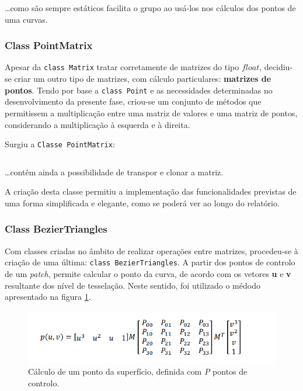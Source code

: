 \documentclass[relatorio.tex]{subfiles}
\begin{document}
\begin{code}
    \label{code:defmat}
\end{code}
\dots como são sempre estáticos facilita o grupo ao usá-los nos cálculos dos pontos de uma curvas.

\subsubsection{Class PointMatrix}
Apesar da \texttt{class Matrix} tratar corretamente de matrizes do tipo $float$,
decidiu-se criar um outro tipo de matrizes, com cálculo particulares:
\textbf{matrizes de pontos}. 
Tendo por base a \texttt{class Point} e as necessidades determinadas no desenvolvimento
da presente fase,
criou-se um conjunto de métodos que permitissem a multiplicação entre
uma matriz de valores e uma matriz de pontos, considerando a multiplicação à esquerda e à direita.

Surgiu a \texttt{Classe PointMatrix}:
\begin{code}
    \label{code:point_matrix.h}
    \inputminted[firstline=6, lastline=10]{cpp}{../../cartesian/PointMatrix.h}
\end{code}
\dots contêm ainda a possibilidade de transpor e clonar a matriz.

A criação desta classe permitiu a implementação das funcionalidades previstas de uma forma
simplificada e elegante, como se poderá ver ao longo do relatório.

\subsubsection{Class BezierTriangles}
Com classes criadas no âmbito de realizar operações entre matrizes,
procedeu-se à criação de uma última: \texttt{class BezierTriangles}.
A partir dos pontos de controlo de um \textit{patch}, permite calcular o ponto da curva,
de acordo com os vetores \textbf{u} e \textbf{v} resultante dos nível de tesselação.
Neste sentido, foi utilizado o médodo apresentado na figura \ref{fig:bezier_point}.
\begin{figure}
    \centering
    \includegraphics[width=\linewidth]{assets/bezier_patches_point.png}
    \caption{Cálculo de um ponto da superfício, definida com \textit{P} pontos de controlo.}
    \label{fig:bezier_point}
\end{figure}
\end{document}
